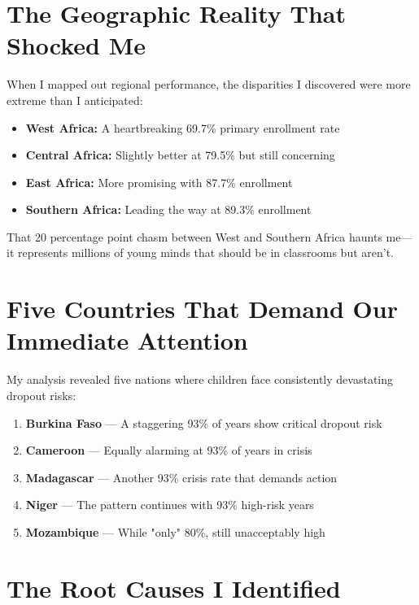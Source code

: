 \documentclass[12pt,a4paper]{article}
\begin{document}
\section{The Geographic Reality That Shocked Me}

When I mapped out regional performance, the disparities I discovered were more extreme than I anticipated:

\begin{itemize}
    \item \textbf{West Africa:} A heartbreaking 69.7\% primary enrollment rate
    \item \textbf{Central Africa:} Slightly better at 79.5\% but still concerning
    \item \textbf{East Africa:} More promising with 87.7\% enrollment
    \item \textbf{Southern Africa:} Leading the way at 89.3\% enrollment
\end{itemize}

That 20 percentage point chasm between West and Southern Africa haunts me---it represents millions of young minds that should be in classrooms but aren't.

\section{Five Countries That Demand Our Immediate Attention}

My analysis revealed five nations where children face consistently devastating dropout risks:

\begin{enumerate}
    \item \textbf{Burkina Faso} --- A staggering 93\% of years show critical dropout risk
    \item \textbf{Cameroon} --- Equally alarming at 93\% of years in crisis
    \item \textbf{Madagascar} --- Another 93\% crisis rate that demands action
    \item \textbf{Niger} --- The pattern continues with 93\% high-risk years
    \item \textbf{Mozambique} --- While "only" 80\%, still unacceptably high
\end{enumerate}

\section{The Root Causes I Identified}
\end{document}
